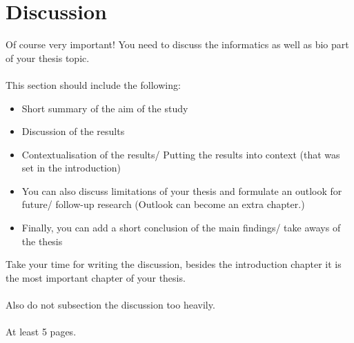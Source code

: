 
\chapter{Discussion}
  \label{sec:diss}

Of course very important! You need to discuss the informatics as well as bio part of your thesis topic.\\\\
This section should include the following:
\begin{itemize}
  \item Short summary of the aim of the study
  \item Discussion of the results
  \item Contextualisation of the results/ Putting the results into context (that was set in the introduction)
  \item You can also discuss limitations of your thesis and formulate an outlook for future/ follow-up research (Outlook can become an extra chapter.)
  \item Finally, you can add a short conclusion of the main findings/ take aways of the thesis
\end{itemize}
Take your time for writing the discussion, besides the introduction chapter it is the most important chapter of your thesis.\\\\
Also do not subsection the discussion too heavily.\\\\
At least 5 pages.